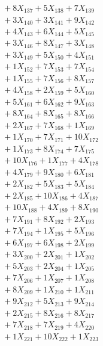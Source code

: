 \documentclass[a4paper,10pt]{article}
\begin{document}
{\begin{align}
&\;  + 8 X_{137} + 5 X_{138} + 7 X_{139} \\[0.3ex]
&\;  + 3 X_{140} + 3 X_{141} + 9 X_{142} \\[0.3ex]
&\;  + 4 X_{143} + 6 X_{144} + 5 X_{145} \\[0.3ex]
&\;  + 3 X_{146} + 8 X_{147} + 3 X_{148} \\[0.3ex]
&\;  + 3 X_{149} + 5 X_{150} + 4 X_{151} \\[0.3ex]
&\;  + 1 X_{152} + 7 X_{153} + 7 X_{154} \\[0.3ex]
&\;  + 1 X_{155} + 7 X_{156} + 8 X_{157} \\[0.3ex]
&\;  + 4 X_{158} + 2 X_{159} + 5 X_{160} \\[0.5ex]\allowbreak
&\;  + 5 X_{161} + 6 X_{162} + 9 X_{163} \\[0.3ex]
&\;  + 8 X_{164} + 8 X_{165} + 8 X_{166} \\[0.3ex]
&\;  + 2 X_{167} + 7 X_{168} + 1 X_{169} \\[0.3ex]
&\;  + 1 X_{170} + 7 X_{171} + 10 X_{172} \\[0.3ex]
&\;  + 1 X_{173} + 8 X_{174} + 7 X_{175} \\[0.3ex]
&\;  + 10 X_{176} + 1 X_{177} + 4 X_{178} \\[0.3ex]
&\;  + 4 X_{179} + 9 X_{180} + 6 X_{181} \\[0.3ex]
&\;  + 2 X_{182} + 5 X_{183} + 5 X_{184} \\[0.3ex]
&\;  + 2 X_{185} + 10 X_{186} + 4 X_{187} \\[0.3ex]
&\;  + 10 X_{188} + 4 X_{189} + 8 X_{190} \\[0.5ex]\allowbreak
&\;  + 7 X_{191} + 8 X_{192} + 2 X_{193} \\[0.3ex]
&\;  + 7 X_{194} + 1 X_{195} + 5 X_{196} \\[0.3ex]
&\;  + 6 X_{197} + 6 X_{198} + 2 X_{199} \\[0.3ex]
&\;  + 3 X_{200} + 2 X_{201} + 1 X_{202} \\[0.3ex]
&\;  + 5 X_{203} + 2 X_{204} + 1 X_{205} \\[0.3ex]
&\;  + 7 X_{206} + 1 X_{207} + 1 X_{208} \\[0.3ex]
&\;  + 8 X_{209} + 1 X_{210} + 1 X_{211} \\[0.3ex]
&\;  + 9 X_{212} + 5 X_{213} + 9 X_{214} \\[0.3ex]
&\;  + 2 X_{215} + 8 X_{216} + 8 X_{217} \\[0.3ex]
&\;  + 7 X_{218} + 7 X_{219} + 4 X_{220} \\[0.5ex]\allowbreak
&\;  + 1 X_{221} + 10 X_{222} + 1 X_{223} \\[0.3ex]

\end{align}}
\end{document}
